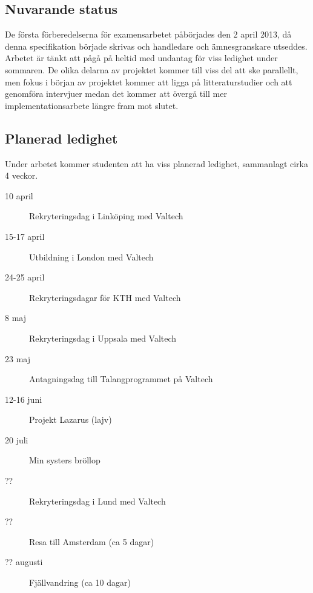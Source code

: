 \documentclass[11pt]{article}
\begin{document}
\subsection{Nuvarande status}

De första förberedelserna för examensarbetet påbörjades den 2 april 2013, då denna specifikation började skrivas och handledare och ämnesgranskare utseddes. Arbetet är tänkt att pågå på heltid med undantag för viss ledighet under sommaren. De olika delarna av projektet kommer till viss del att ske parallellt, men fokus i början av projektet kommer att ligga på litteraturstudier och att genomföra intervjuer medan det kommer att övergå till mer implementationsarbete längre fram mot slutet.

\subsection{Planerad ledighet}

Under arbetet kommer studenten att ha viss planerad ledighet, sammanlagt cirka 4 veckor.

\begin{description}
\item[10 april] Rekryteringsdag i Linköping med Valtech
\item[15-17 april] Utbildning i London med Valtech
\item[24-25 april] Rekryteringsdagar för KTH med Valtech
\item[8 maj] Rekryteringsdag i Uppsala med Valtech
\item[23 maj] Antagningsdag till Talangprogrammet på Valtech
\item[12-16 juni] Projekt Lazarus (lajv)
\item[20 juli] Min systers bröllop
\item[??] Rekryteringsdag i Lund med Valtech
\item[??] Resa till Amsterdam (ca 5 dagar)
\item[?? augusti] Fjällvandring (ca 10 dagar)
\end{description}
\end{document}
